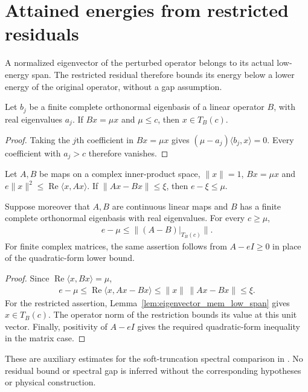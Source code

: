 \section{Attained energies from restricted residuals}
\label{sec:ground_energy_residual}

A normalized eigenvector of the perturbed operator belongs to its actual
low-energy span. The restricted residual therefore bounds its energy
below a lower energy of the original operator, without a gap assumption.

\begin{lemma}
    \label{lem:eigenvector_mem_low_span}
    \leanok
    Let $b_j$ be a finite complete orthonormal eigenbasis of a linear
    operator $B$, with real eigenvalues $a_j$. If $Bx=\mu x$ and
    $\mu\leq c$, then $x\in T_B(c)$.
\end{lemma}
\begin{proof}\leanok
    Taking the $j$th coefficient in $Bx=\mu x$ gives
    $(\mu-a_j)\langle b_j,x\rangle=0$.
    Every coefficient with $a_j>c$ therefore vanishes.
\end{proof}

\begin{lemma}
    \label{lem:ground_energy_restricted_residual}
    \leanok
    Let $A,B$ be maps on a complex inner-product space, $\|x\|=1$,
    $Bx=\mu x$ and
    $e\|x\|^2\leq\operatorname{Re}\langle x,Ax\rangle$.
    If $\|Ax-Bx\|\leq\xi$, then $e-\xi\leq\mu$.

    Suppose moreover that $A,B$ are continuous linear maps and $B$
    has a finite complete orthonormal eigenbasis with real eigenvalues.
    For every $c\geq\mu$,
    \begin{align}
        e-\mu\leq\|(A-B)|_{T_B(c)}\|.
    \end{align}
    For finite complex matrices, the same assertion follows from
    $A-eI\geq0$ in place of the quadratic-form lower bound.
\end{lemma}
\begin{proof}\leanok
    Since $\operatorname{Re}\langle x,Bx\rangle=\mu$,
    \begin{align}
        e-\mu
        \leq\operatorname{Re}\langle x,Ax-Bx\rangle
        \leq\|x\|\,\|Ax-Bx\|\leq\xi.
    \end{align}
    For the restricted assertion,
    Lemma~\ref{lem:eigenvector_mem_low_span} gives $x\in T_B(c)$.
    The operator norm of the restriction bounds its value at this
    unit vector. Finally, positivity of $A-eI$ gives the required
    quadratic-form inequality in the matrix case.
\end{proof}

These are auxiliary estimates for the soft-truncation spectral
comparison in
\cite[lines 1195--1255 and 1373--1392]{Arad2016RigorousRG}.
No residual bound or spectral gap is inferred without the corresponding
hypotheses or physical construction.
